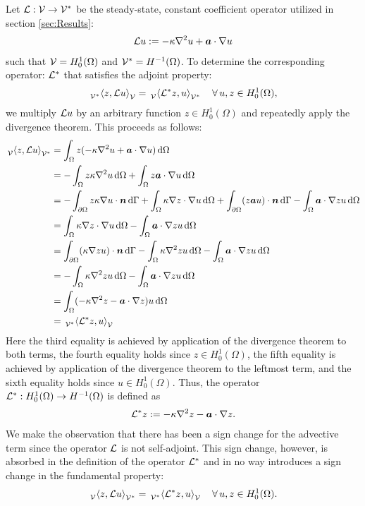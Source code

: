 Let $\mathcal{L}: \mathcal{V} \to \mathcal{V}^*$
be the steady-state, constant coefficient operator
utilized in section \ref{sec:Results}:
%
\begin{gather}
\mathcal{L} u := -\kappa \nabla^2 {u} + \boldsymbol{a} \cdot \nabla {u}
\end{gather}
such that $\mathcal{V} = H^1_0(\Omega)$ and $\mathcal{V}^* = H^{-1}(\Omega)$.
To determine the corresponding operator:
$\mathcal{L}^*$ that satisfies the adjoint property:
%
\begin{gather}
\,{}_{\mathcal{V}^*}^{}\!\left< {z}, {\mathcal{L} u} \right>_{\mathcal{V}} = \,{}_{\mathcal{V}}^{}\!\left< {\mathcal{L}^* z}, {u} \right>_{\mathcal{V}^*}
\quad \forall \, u, z \in H^1_0(\Omega),
\end{gather}
%
we multiply $\mathcal{L} u$ by an
arbitrary function $z \in H^1_0(\Omega)$ and
repeatedly apply the divergence theorem.
This proceeds as follows:
%
\begin{align*}
\,{}_{\mathcal{V}}^{}\!\left< {z}, {\mathcal{L} u} \right>_{\mathcal{V}^*}
&=
\int_{\Omega} z (-\kappa \nabla^2 {u} + \boldsymbol{a} \cdot \nabla {u}) \, \text{d} \Omega \\
&=
- \int_{\Omega} z \kappa \nabla^2 u \, \text{d} \Omega +
\int_{\Omega} z \boldsymbol{a} \cdot \nabla u \, \text{d} \Omega \\
&=
-\int_{\partial \Omega} z \kappa \nabla u \cdot \boldsymbol{n} \, \text{d} \Gamma +
\int_{\Omega} \kappa \nabla z \cdot \nabla u \, \text{d} \Omega +
\int_{\partial \Omega} (z \boldsymbol{a} u) \cdot \boldsymbol{n} \, \text{d} \Gamma -
\int_{\Omega} \boldsymbol{a} \cdot \nabla z u \, \text{d} \Omega \\
&=
\int_{\Omega} \kappa \nabla z \cdot \nabla u \, \text{d} \Omega -
\int_{\Omega} \boldsymbol{a} \cdot \nabla z u \, \text{d} \Omega \\
&=
\int_{\partial \Omega} (\kappa \nabla z u) \cdot \boldsymbol{n} \, \text{d} \Gamma -
\int_{\Omega} \kappa \nabla^2 z u \, \text{d} \Omega -
\int_{\Omega} \boldsymbol{a} \cdot \nabla z u \, \text{d} \Omega \\
&=
- \int_{\Omega} \kappa \nabla^2 z u \, \text{d} \Omega -
\int_{\Omega} \boldsymbol{a} \cdot \nabla z u \, \text{d} \Omega \\
&=
\int_{\Omega} (-\kappa \nabla^2 {z} - \boldsymbol{a} \cdot \nabla {z}) u \,
\text{d} \Omega \\
&=
\,{}_{\mathcal{V}^*}^{}\!\left< {\mathcal{L}^* z}, {u} \right>_{\mathcal{V}}
\end{align*}
%
Here the third equality is achieved by application
of the divergence theorem to both terms,
the fourth equality holds since $z \in H^1_0(\Omega)$,
the fifth equality is achieved by application of the
divergence theorem to the leftmost term, and the sixth
equality holds since $u \in H^1_0(\Omega)$. Thus, the
operator $\mathcal{L}^* : H^1_0(\Omega) \to H^{-1}(\Omega)$ is defined as
%
\begin{gather}
\mathcal{L}^* z := -\kappa \nabla^2 {z} - \boldsymbol{a} \cdot \nabla {z}.
\end{gather}
%
We make the observation that there has been a sign
change for the advective term since the operator
$\mathcal{L}$ is not self-adjoint.
This sign change, however, is absorbed in the definition
of the operator $\mathcal{L}^*$ and in no way introduces
a sign change in the fundamental property:
%
\begin{gather}
\,{}_{\mathcal{V}}^{}\!\left< {z}, {\mathcal{L} u} \right>_{\mathcal{V}^*} = \,{}_{\mathcal{V}^*}^{}\!\left< {\mathcal{L}^* z}, {u} \right>_{\mathcal{V}} \quad \forall \, u, z \in H^1_0(\Omega).
\label{eq:adv_adjoint}
\end{gather}

